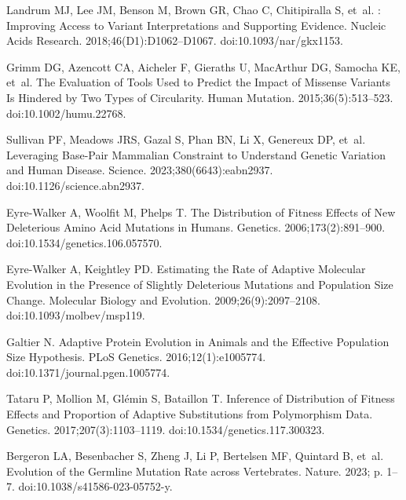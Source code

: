 \documentclass[10pt,letterpaper]{article}
\begin{document}
\begin{thebibliography}{10}
Landrum MJ, Lee JM, Benson M, Brown GR, Chao C, Chitipiralla S, et~al.
: Improving Access to Variant Interpretations and
Supporting Evidence.
\newblock Nucleic Acids Research. 2018;46(D1):D1062--D1067.
\newblock doi:{10.1093/nar/gkx1153}.

Grimm DG, Azencott CA, Aicheler F, Gieraths U, MacArthur DG, Samocha KE, et~al.
\newblock The {{Evaluation}} of {{Tools Used}} to {{Predict}} the {{Impact}} of
{{Missense Variants Is Hindered}} by {{Two Types}} of {{Circularity}}.
\newblock Human Mutation. 2015;36(5):513--523.
\newblock doi:{10.1002/humu.22768}.

Sullivan PF, Meadows JRS, Gazal S, Phan BN, Li X, Genereux DP, et~al.
\newblock Leveraging Base-Pair Mammalian Constraint to Understand Genetic
Variation and Human Disease.
\newblock Science. 2023;380(6643):eabn2937.
\newblock doi:{10.1126/science.abn2937}.

{Eyre-Walker} A, Woolfit M, Phelps T.
\newblock The Distribution of Fitness Effects of New Deleterious Amino Acid
Mutations in Humans.
\newblock Genetics. 2006;173(2):891--900.
\newblock doi:{10.1534/genetics.106.057570}.

{Eyre-Walker} A, Keightley PD.
\newblock Estimating the {{Rate}} of {{Adaptive Molecular Evolution}} in the
{{Presence}} of {{Slightly Deleterious Mutations}} and {{Population Size
Change}}.
\newblock Molecular Biology and Evolution. 2009;26(9):2097--2108.
\newblock doi:{10.1093/molbev/msp119}.

Galtier N.
\newblock Adaptive Protein Evolution in Animals and the Effective Population
Size Hypothesis.
\newblock PLoS Genetics. 2016;12(1):e1005774.
\newblock doi:{10.1371/journal.pgen.1005774}.

Tataru P, Mollion M, Gl{\'e}min S, Bataillon T.
\newblock Inference of Distribution of Fitness Effects and Proportion of
Adaptive Substitutions from Polymorphism Data.
\newblock Genetics. 2017;207(3):1103--1119.
\newblock doi:{10.1534/genetics.117.300323}.

Bergeron LA, Besenbacher S, Zheng J, Li P, Bertelsen MF, Quintard B, et~al.
\newblock Evolution of the Germline Mutation Rate across Vertebrates.
\newblock Nature. 2023; p. 1--7.
\newblock doi:{10.1038/s41586-023-05752-y}.


\end{thebibliography}
\end{document}
